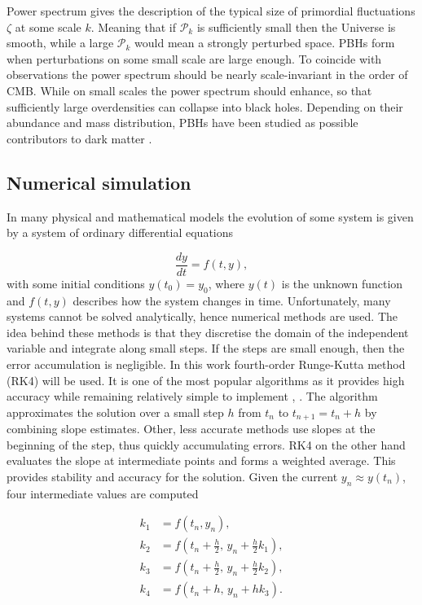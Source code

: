 Power spectrum gives the description of the typical size of primordial fluctuations $\zeta$ at some scale $k$. Meaning that if $\mathcal{P}_k$ is sufficiently small then the Universe is smooth, while a large $\mathcal{P}_k$ would mean a strongly perturbed space. PBHs form when perturbations on some small scale are large enough. To coincide with observations the power spectrum should be nearly scale-invariant in the order of CMB. While on small scales the power spectrum should enhance, so that sufficiently large overdensities can collapse into black holes. Depending on their abundance and mass distribution, PBHs have been studied as possible contributors to dark matter \cite{karciauskas2025primordial}.

\subsection{Numerical simulation}

In many physical and mathematical models the evolution of some system is given by a system of ordinary differential equations

\begin{equation}
    \frac{dy}{dt} = f(t,y),
\end{equation}
with some initial conditions $y(t_0) = y_0$, where $y(t)$ is the unknown function and $f(t,y)$ describes how the system changes in time. Unfortunately, many systems cannot be solved analytically, hence numerical methods are used. The idea behind these methods is that they discretise the domain of the independent variable and integrate along small steps. If the steps are small enough, then the error accumulation is negligible. In this work fourth-order Runge-Kutta method (RK4) will be used. It is one of the most popular algorithms as it provides high accuracy while remaining relatively simple to implement \cite{chapra2012applied}, \cite{butcher2016numerical}. The algorithm approximates the solution over a small step $h$ from $t_n$ to $t_{n+1} = t_n + h$ by combining slope estimates. Other, less accurate methods use slopes at the beginning of the step, thus quickly accumulating errors. RK4 on the other hand evaluates the slope at intermediate points and forms a weighted average. This provides stability and accuracy for the solution. Given the current $y_n \approx y(t_n)$, four intermediate values are computed

\begin{align}
k_1 &= f(t_n, y_n), \\
k_2 &= f\!\left(t_n+\frac{h}{2},\, y_n+\frac{h}{2}k_1\right), \\
k_3 &= f\!\left(t_n+\frac{h}{2},\, y_n+\frac{h}{2}k_2\right), \\
k_4 &= f\!\left(t_n+h,\, y_n+h k_3\right).
\end{align}

